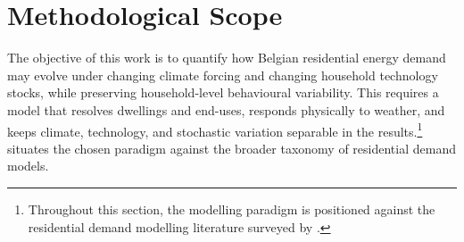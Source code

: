\label{ch:materialsmethods}

\section{Methodological Scope}
\label{sec:methodological_scope}
 
The objective of this work is to quantify how Belgian residential energy demand may evolve under changing climate forcing and changing household technology stocks, while preserving household-level behavioural variability. This requires a model that resolves dwellings and end-uses, responds physically to weather, and keeps climate, technology, and stochastic variation separable in the results.\footnote{Throughout this section, the modelling paradigm is positioned against the residential demand modelling literature surveyed by \textcite{swan_modeling_2009,kavgicReviewBottomupBuilding2010, Allegrini2015}.}  situates the chosen paradigm against the broader taxonomy of residential demand models.
 
